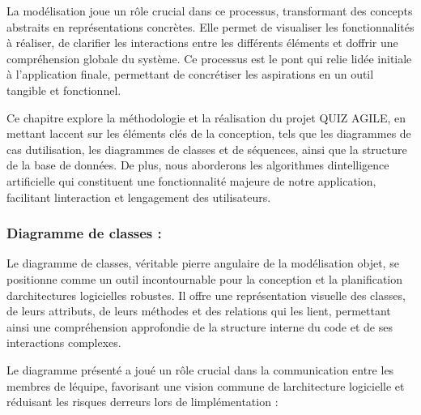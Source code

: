 \documentclass[12pt,a4paper,twoside]{report}
\begin{document}
La modélisation joue un rôle crucial dans ce processus, transformant des
concepts abstraits en représentations concrètes. Elle permet de
visualiser les fonctionnalités à réaliser, de clarifier les interactions
entre les différents éléments et d\textquotesingle offrir une
compréhension globale du système. Ce processus est le pont qui relie
l\textquotesingle idée initiale à l'application finale, permettant de
concrétiser les aspirations en un outil tangible et fonctionnel.

Ce chapitre explore la méthodologie et la réalisation du projet QUIZ
AGILE, en mettant l\textquotesingle accent sur les éléments clés de la
conception, tels que les diagrammes de cas
d\textquotesingle utilisation, les diagrammes de classes et de
séquences, ainsi que la structure de la base de données. De plus, nous
aborderons les algorithmes d\textquotesingle intelligence artificielle
qui constituent une fonctionnalité majeure de notre application,
facilitant l\textquotesingle interaction et l\textquotesingle engagement
des utilisateurs.

\hypertarget{diagramme-de-classes}{%
\subsubsection{\texorpdfstring{Diagramme de classes :
}{Diagramme de classes : }}\label{diagramme-de-classes}}

Le diagramme de classes, véritable pierre angulaire de la modélisation
objet, se positionne comme un outil incontournable pour la conception et
la planification d\textquotesingle architectures logicielles robustes.
Il offre une représentation visuelle des classes, de leurs attributs, de
leurs méthodes et des relations qui les lient, permettant ainsi une
compréhension approfondie de la structure interne du code et de ses
interactions complexes.

Le diagramme présenté a joué un rôle crucial dans la communication entre
les membres de l\textquotesingle équipe, favorisant une vision commune
de l\textquotesingle architecture logicielle et réduisant les risques
d\textquotesingle erreurs lors de l\textquotesingle implémentation :
\end{document}
